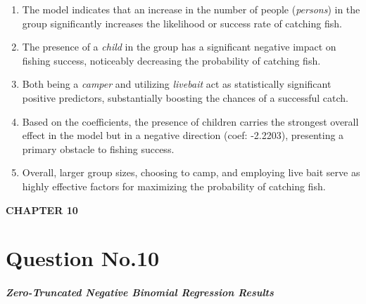 \begin{enumerate}
\def\labelenumi{\arabic{enumi}.}
\item
  The model indicates that an increase in the number of people
  (\emph{persons}) in the group significantly increases the likelihood
  or success rate of catching fish.
\item
  The presence of a \emph{child} in the group has a significant negative
  impact on fishing success, noticeably decreasing the probability of
  catching fish.
\item
  Both being a \emph{camper} and utilizing \emph{livebait} act as
  statistically significant positive predictors, substantially boosting
  the chances of a successful catch.
\item
  Based on the coefficients, the presence of children carries the
  strongest overall effect in the model but in a negative direction
  (coef: -2.2203), presenting a primary obstacle to fishing success.
\item
  Overall, larger group sizes, choosing to camp, and employing live bait
  serve as highly effective factors for maximizing the probability of
  catching fish.
\end{enumerate}

\textbf{CHAPTER 10}

\section{Question No.10}\label{question-no.10}

\subparagraph{Zero-Truncated Negative Binomial Regression
Results}\label{zero-truncated-negative-binomial-regression-results}


